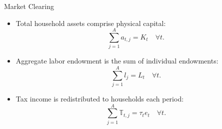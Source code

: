 \documentclass[aspectratio=1610]{beamer}
\begin{document}
\begin{frame}[fragile]{Market Clearing}


\begin{itemize}
\item Total household assets comprise physical capital:
     \begin{equation}
    \sum_{j = 1}^{A} a_{t,j} = K_t \quad \forall t.
\end{equation}
\item Aggregate labor endowment is the sum of individual endowments:
\begin{equation}
    \sum_{j = 1}^{A} l_j = L_t \quad \forall t.
\end{equation}
\item Tax income is redistributed to households each period:
\begin{equation}
    \sum_{j=1}^{A} \mathbb{T}_{t,j} = \tau_{t} e_t \quad  \forall t .
\end{equation}


\end{itemize}



\end{frame}

\end{document}

